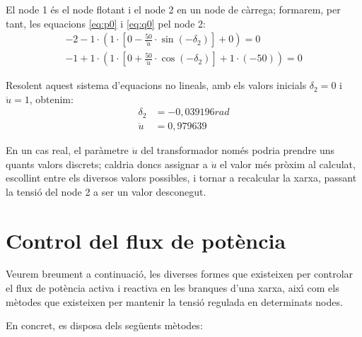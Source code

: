 \begin{exemple}
El node 1 \'{e}s el node flotant i el node 2 en un node de c\`{a}rrega; formarem, per tant,  les equacions \eqref{eq:p0} i \eqref{eq:q0} pel node 2:
\begin{align*}
-2 - 1 \cdot\left( 1 \cdot\left[ 0 -\frac{50}{\ddot{u}} \cdot\sin(-\delta_2) \right]  + 0 \right)  = 0   \\[1.5ex]
-1 + 1 \cdot\left( 1 \cdot\left[0 + \frac{50}{\ddot{u}} \cdot\cos(-\delta_2) \right]  +
1\cdot (-50) \right)  = 0
\end{align*}

Resolent aquest sistema d'equacions no lineals, amb els valors inicials $\delta_2=0$ i
$\ddot{u}=1$, obtenim:
\begin{align*}
   \delta_2 &= -0{,}039196\unit{rad} \\[1ex]
   \ddot{u} & =0{,}979639
\end{align*}

En un cas real, el par\`{a}metre $\ddot{u}$ del transformador nom\'{e}s podria  prendre uns quants
valors discrets; caldria doncs assignar a $\ddot{u}$ el valor m\'{e}s pr\`{o}xim al calculat,
escollint entre els diversos valors possibles, i tornar a recalcular la xarxa, passant la
tensi\'{o} del node 2 a ser un valor desconegut.

\end{exemple}

\section{Control del flux de pot\`{e}ncia} 

Veurem breument a continuaci\'{o}, les diverses formes que existeixen
per controlar el flux de pot\`{e}ncia activa i reactiva en les branques
d'una xarxa, aix\'{\i} com els m\`{e}todes que existeixen per mantenir la
tensi\'{o} regulada en determinats nodes.

En concret, es disposa dels seg\"{u}ents m\`{e}todes:

